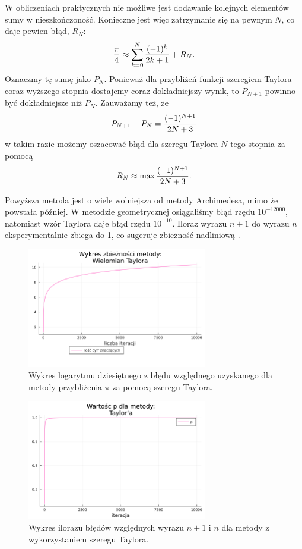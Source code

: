 W obliczeniach praktycznych nie możliwe jest dodawanie kolejnych elementów sumy w nieszkończoność. Konieczne jest więc zatrzymanie się na pewnym $N$, co daje pewien błąd, $R_N$:
$$\frac\pi4\approx \sum\limits_{k=0}^N{(-1)^k\over 2k+1}+R_N.$$
Oznaczmy tę sumę jako $P_N$. Ponieważ dla przybliżeń funkcji szeregiem Taylora coraz wyższego stopnia dostajemy coraz dokładniejszy wynik, to $P_{N+1}$ powinno być dokładniejsze niż $P_N$. Zauważamy też, że
$$P_{N+1}-P_N={(-1)^{N+1}\over 2N+3}$$
w takim razie możemy oszacować błąd dla szeregu Taylora $N$-tego stopnia za pomocą
$$R_N\approx \max{(-1)^{N+1}\over 2N+3}.$$

Powyższa metoda jest o wiele wolniejsza od metody Archimedesa, mimo że powstała później. W metodzie geometrycznej osiągaliśmy błąd rzędu $10^{-12000}$, natomiast wzór Taylora daje błąd rzędu $10^{-10}$. Iloraz wyrazu $n+1$ do wyrazu $n$ eksperymentalnie zbiega do 1, co sugeruje zbieżność nadliniową \cite{bog}.

\begin{figure}[!h]\centering
    \renewcommand{\figurename}{Wykres}
    \includegraphics[width=0.7\textwidth]{../prog/taylor_log_error.png}
    \caption{Wykres logarytmu dziesiętnego z błędu względnego uzyskanego dla metody przybliżenia $\pi$ za pomocą szeregu Taylora.}
    \label{taylor-series-error}
\end{figure}

\begin{figure}[!h]\centering
    \renewcommand{\figurename}{Wykres}
    \includegraphics[width=0.7\textwidth]{../prog/taylor_error_ratio.png}
    \caption{Wykres ilorazu błędów względnych wyrazu $n+1$ i $n$ dla metody z wykorzystaniem szeregu Taylora.}
    \label{taylor-series-convergence}
\end{figure}
